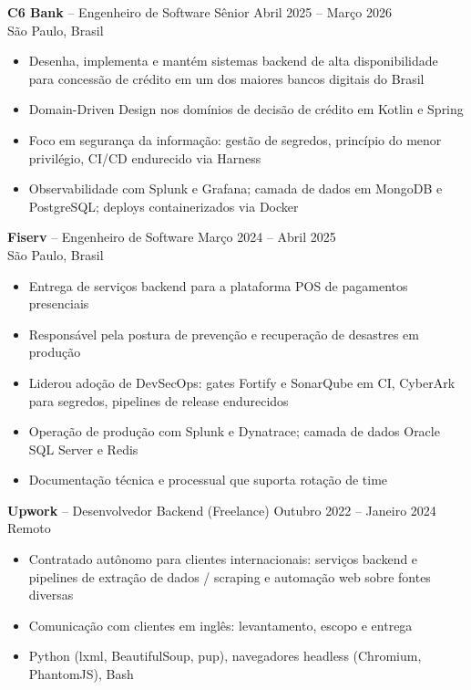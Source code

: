 \documentclass[10pt,a4paper]{article}
\begin{document}
\noindent\textbf{C6 Bank} -- Engenheiro de Software Sênior \hfill Abril 2025 -- Março 2026\\
São Paulo, Brasil
\begin{itemize}
\item Desenha, implementa e mantém sistemas backend de alta disponibilidade para concessão de crédito em um dos maiores bancos digitais do Brasil
\item Domain-Driven Design nos domínios de decisão de crédito em Kotlin e Spring
\item Foco em segurança da informação: gestão de segredos, princípio do menor privilégio, CI/CD endurecido via Harness
\item Observabilidade com Splunk e Grafana; camada de dados em MongoDB e PostgreSQL; deploys containerizados via Docker
\end{itemize}

\noindent\textbf{Fiserv} -- Engenheiro de Software \hfill Março 2024 -- Abril 2025\\
São Paulo, Brasil
\begin{itemize}
\item Entrega de serviços backend para a plataforma POS de pagamentos presenciais
\item Responsável pela postura de prevenção e recuperação de desastres em produção
\item Liderou adoção de DevSecOps: gates Fortify e SonarQube em CI, CyberArk para segredos, pipelines de release endurecidos
\item Operação de produção com Splunk e Dynatrace; camada de dados Oracle SQL Server e Redis
\item Documentação técnica e processual que suporta rotação de time
\end{itemize}

\noindent\textbf{Upwork} -- Desenvolvedor Backend (Freelance) \hfill Outubro 2022 -- Janeiro 2024\\
Remoto
\begin{itemize}
\item Contratado autônomo para clientes internacionais: serviços backend e pipelines de extração de dados / scraping e automação web sobre fontes diversas
\item Comunicação com clientes em inglês: levantamento, escopo e entrega
\item Python (lxml, BeautifulSoup, pup), navegadores headless (Chromium, PhantomJS), Bash
\end{itemize}
\end{document}
